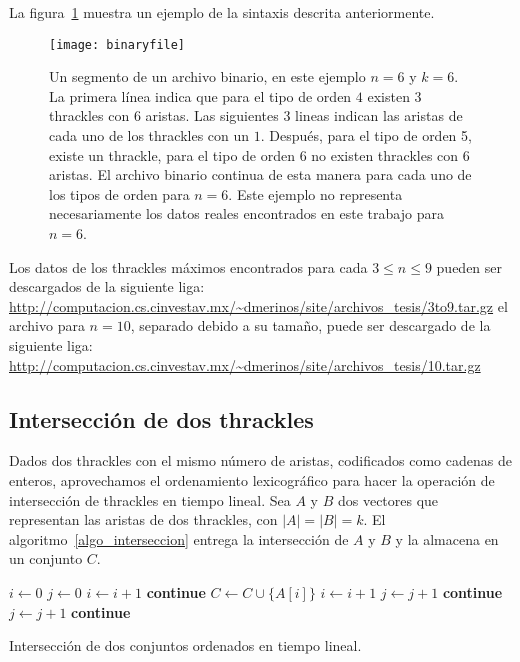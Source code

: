   La figura~\ref{fig:binaryfile} muestra un ejemplo de la sintaxis
  descrita anteriormente.
  \begin{figure}[htpb]
    \centering
    \texttt{[image: binaryfile]}
    \caption{Un segmento de un archivo binario, en este ejemplo $n=6$ y $k=6$.
    La primera línea indica que para el tipo de orden $4$ existen $3$ thrackles
    con $6$ aristas. Las siguientes 3 lineas indican las aristas de cada uno
    de los thrackles con un $1$. Después, para el tipo de orden 5, existe un
    thrackle, para el tipo de orden 6 no existen thrackles con 6 aristas. El
    archivo binario continua de esta manera para cada uno de los tipos de orden
    para $n=6$. Este ejemplo no representa necesariamente los datos reales
    encontrados en este trabajo para $n=6$.}
    \label{fig:binaryfile}
  \end{figure}

  Los datos de los thrackles máximos encontrados para cada $ 3\leq n \leq 9$
  pueden ser descargados de la siguiente liga:
  \url{http://computacion.cs.cinvestav.mx/~dmerinos/site/archivos_tesis/3to9.tar.gz}
  el archivo para $n=10$, separado debido a su tamaño,
   puede ser descargado de la siguiente liga:
  \url{http://computacion.cs.cinvestav.mx/~dmerinos/site/archivos_tesis/10.tar.gz}

\subsection{Intersección de dos thrackles}
  Dados dos thrackles con el mismo número de aristas, codificados como cadenas
  de enteros, aprovechamos el ordenamiento lexicográfico para hacer la
  operación de intersección de thrackles en tiempo lineal.
  Sea $A$ y $B$ dos vectores que representan las aristas de dos thrackles, con
  $|A|=|B|=k$. El algoritmo~\ref{algo_interseccion} entrega la intersección de $A$ y $B$ y la almacena en un conjunto $C$.
  \begin{algorithm}[htpb]
    \begin{algorithmic}[1]
      \State $i\gets 0$
      \State $j\gets 0$
          \State $i\gets i+1$
          \State \textbf{continue}
        \EndIf
          \State $C\gets C\cup \{A[i]\}$
          \State $i\gets i+1$
          \State $j\gets j+1$
          \State \textbf{continue}
        \EndIf
          \State $j\gets j+1$
          \State \textbf{continue}
        \EndIf
      \EndWhile
      \EndProcedure
    \end{algorithmic}
    \caption{Intersección de dos conjuntos ordenados en tiempo lineal.}
    \label{algo_interseccion}
  \end{algorithm}

